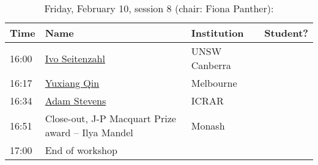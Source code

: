 \documentclass[amsmath,onecolumn]{revtex4-1}
\begin{document}
\begin{table}[!htbp]
	\centering
	\caption{Friday, February 10, session 8 (chair: Fiona Panther):}
\begin{tabular}{| l | l | l | c |}
	\hline
	Time & Name  & Institution & Student? \\ 		
	\hline
	16:00 &\href{https://forms.gle/ZM8HoYqw1VRShzLNA}{Ivo Seitenzahl} & UNSW Canberra &  \\
	16:17 & \href{https://forms.gle/ZM8HoYqw1VRShzLNA}{Yuxiang Qin} & Melbourne &  \\
	16:34 & \href{https://forms.gle/ZM8HoYqw1VRShzLNA}{Adam Stevens} & ICRAR &  \\
	16:51 & Close-out, J-P Macquart Prize award -- Ilya Mandel & Monash & \\
	17:00 & End of workshop & & \\
	\hline
\end{tabular}
\end{table}
\end{document}
